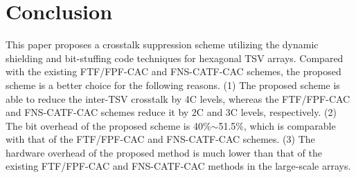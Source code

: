 \documentclass[lettersize,journal]{IEEEtran}
\begin{document}
%
%
%
%


\section{Conclusion}\label{sec-conclusion}
This paper proposes a crosstalk suppression scheme utilizing the dynamic shielding and bit-stuffing code techniques for hexagonal TSV arrays. 
Compared with the existing FTF/FPF-CAC and FNS-CATF-CAC schemes, the proposed scheme is a better choice for the following reasons. (1) The proposed scheme is able to reduce the inter-TSV crosstalk by 4C levels, whereas the FTF/FPF-CAC and FNS-CATF-CAC schemes reduce it by 2C and 3C levels, respectively. (2) The bit overhead of the proposed scheme is 40\%$\sim$51.5\%, which is comparable with that of the FTF/FPF-CAC and FNS-CATF-CAC schemes. (3) The hardware overhead of the proposed method is much lower than that of the existing FTF/FPF-CAC and FNS-CATF-CAC methods in the large-scale arrays.
\end{document}
